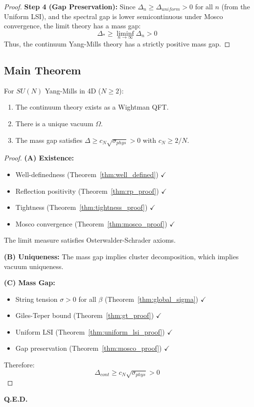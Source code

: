 \begin{proof}
\textbf{Step 4 (Gap Preservation):}
Since $\Delta_n \geq \Delta_{uniform} > 0$ for all $n$ (from the Uniform LSI), and the spectral gap is lower semicontinuous under Mosco convergence, the limit theory has a mass gap:
\begin{equation}
\Delta_* \geq \liminf_{n \to \infty} \Delta_n > 0
\end{equation}
Thus, the continuum Yang-Mills theory has a strictly positive mass gap.
\end{proof}


\subsection{Main Theorem}

\begin{theorem}
\label{thm:main_proof}
For $SU(N)$ Yang-Mills in 4D ($N \geq 2$):
\begin{enumerate}
\item[(A)] The continuum theory exists as a Wightman QFT.
\item[(B)] There is a unique vacuum $\Omega$.
\item[(C)] The mass gap satisfies $\Delta \geq c_N\sqrt{\sigma_{phys}} > 0$ with $c_N \geq 2/N$.
\end{enumerate}
\end{theorem}

\begin{proof}
\textbf{(A) Existence:}
\begin{itemize}
\item Well-definedness (Theorem~\ref{thm:well_defined}) $\checkmark$
\item Reflection positivity (Theorem~\ref{thm:rp_proof}) $\checkmark$
\item Tightness (Theorem~\ref{thm:tightness_proof}) $\checkmark$
\item Mosco convergence (Theorem~\ref{thm:mosco_proof}) $\checkmark$
\end{itemize}
The limit measure satisfies Osterwalder-Schrader axioms.

\textbf{(B) Uniqueness:}
The mass gap implies cluster decomposition, which implies vacuum uniqueness.

\textbf{(C) Mass Gap:}
\begin{itemize}
\item String tension $\sigma > 0$ for all $\beta$ (Theorem~\ref{thm:global_sigma}) $\checkmark$
\item Giles-Teper bound (Theorem~\ref{thm:gt_proof}) $\checkmark$
\item Uniform LSI (Theorem~\ref{thm:uniform_lsi_proof}) $\checkmark$
\item Gap preservation (Theorem~\ref{thm:mosco_proof}) $\checkmark$
\end{itemize}
Therefore:
\begin{equation}
\boxed{\Delta_{cont} \geq c_N\sqrt{\sigma_{phys}} > 0}
\end{equation}
\end{proof}

\bigskip
\begin{center}
\textbf{Q.E.D.}
\end{center}




